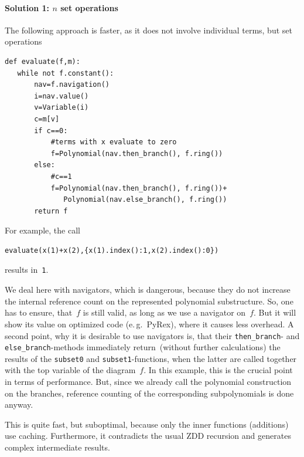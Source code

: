 \paragraph{Solution 1: $n$ set operations}
The following approach is faster, as it does not involve individual terms, but set operations

\begin{lstlisting}
def evaluate(f,m):
   while not f.constant():
       nav=f.navigation()
       i=nav.value()
       v=Variable(i)
       c=m[v]
       if c==0:
           #terms with x evaluate to zero
           f=Polynomial(nav.then_branch(), f.ring())
       else:
           #c==1
           f=Polynomial(nav.then_branch(), f.ring())+
              Polynomial(nav.else_branch(), f.ring())
       return f   
\end{lstlisting}
For example, the call
\begin{lstlisting}
evaluate(x(1)+x(2),{x(1).index():1,x(2).index():0})  
\end{lstlisting}
results in~\lstinline|1|.



We deal here with navigators, which is dangerous, because
they do not increase the internal reference count on the represented polynomial
substructure. So, one has
to ensure, that~$f$ is still valid, as long as we use a navigator on~$f$.
But it will show its value on optimized code (e.\,g.\ PyRex), where it causes
less overhead. 
A second point, why it is desirable to use navigators is, that their
\lstinline|then_branch|- and \lstinline|else_branch|-methods immediately return~(without
further calculations) the
results of the \lstinline|subset0| and \lstinline|subset1|-functions, when the latter are
called together  with the top variable of the diagram~$f$.
%
In this example, this is the crucial point in terms of performance.
But, since we already call the polynomial construction on the branches,
reference counting of the corresponding subpolynomials is done anyway.

This is quite fast, but suboptimal, because only the inner functions (additions) use caching.
%
Furthermore, it contradicts the usual ZDD recursion and generates complex intermediate results.

